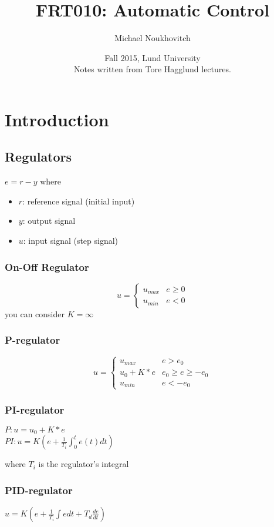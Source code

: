 \documentclass[]{article}
\theoremstyle{definition}
\begin{document}
	\let\ref\Cref

	\title{\bf{FRT010: Automatic Control}}
	\date{Fall 2015, Lund University\\ \center Notes written from Tore Hagglund lectures.}
	\author{Michael Noukhovitch}

	\maketitle
	\newpage
	\tableofcontents
	\newpage

	\section{Introduction}
	\subsection{Regulators}
	$e = r - y$ where
	\begin{itemize}
		\item $r$: reference signal (initial input)
		\item $y$: output signal
		\item $u$: input signal (step signal)
	\end{itemize}

	\subsubsection{On-Off Regulator}
	\[ 
		u = 
		\begin{cases}
			u_{max} & e \ge 0 \\
			u_{min} & e < 0
		\end{cases}
	\]
	you can consider $K = \infty$


	\subsubsection{P-regulator}
	\[ 
		u = 
		\begin{cases}
			u_{max} & e > e_0 \\
			u_0 + K*e & e_0 \ge e \ge -e_0 \\
			u_{min} & e < -e_0
		\end{cases}
	\]

	\subsubsection{PI-regulator}
	$P: u = u_0 + K*e $ \\
	$PI: u = K(e + \frac{1}{T_i} \int_{0}^{t} e(t)dt) $

	where $T_i$ is the regulator's integral

	\subsubsection{PID-regulator}
	$u = K(e + \frac{1}{T_i} \int edt + T_d \frac{de}{dt})$


	
\end{document}
